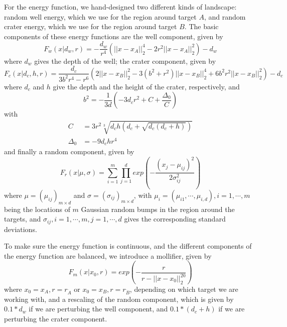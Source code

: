 \documentclass[nofootinbib,english, aip, jcp, priprint, graphicx,floatfix]{revtex4-1}
\theoremstyle{plain}
\theoremstyle{definition}
\theoremstyle{plain}
\begin{document}
For the energy function, we hand-designed two different kinds of landscape: random well energy, which we use for the region around target $A$, and random crater energy, which we use for the region around target $B$. The basic components of these energy functions are the well component, given by
\begin{equation}
F_w(x|d_w, r) = -\frac{d_w}{r^4}(||x - x_A||_2^4 - 2r^2||x - x_A||_2^2) - d_w
\end{equation}
where $d_w$ gives the depth of the well; the crater component, given by
\begin{equation}
F_c(x|d_c, h, r) = \frac{d_c}{3b^2r^4 - r^6}(2||x - x_B||_2^2 - 3(b^2 + r^2)||x - x_B||_2^4 + 6b^2r^2||x - x_B||_2^2) - d_c
\end{equation}
where $d_c$ and $h$ give the depth and the height of the crater, respectively, and
\begin{equation}
b^2 = -\frac{1}{3d}(-3 d_c r^2 + C + \frac{\Delta_0}{C})
\end{equation}
with
\begin{align*}
C &= 3r^2 \sqrt[3]{d_c h (d_c + \sqrt{d_c (d_c + h)})} \\
\Delta_0 &= -9 d_c h r^4
\end{align*}
and finally a random component, given by
\begin{equation}
F_r(x|\mu, \sigma) = \sum_{i=1}^m\prod_{j=1}^d exp(-\frac{(x_j - \mu_{i j})^2}{2\sigma_{i j}^2})
\end{equation}
where $\mu=(\mu_{i j})_{m \times d}$ and $\sigma=(\sigma_{i j})_{m \times d}$, with $\mu_i=(\mu_{i 1}, \cdots, \mu_{i, d}), i=1, \cdots, m$ being the locations of $m$ Gaussian random bumps in the region around the targets, and $\sigma_{i j}, i=1, \cdots, m, j=1, \cdots, d$ gives the corresponding standard deviations.

To make sure the energy function is continuous, and the different components of the energy function are balanced, we introduce a mollifier, given by
\begin{equation}
F_m(x|x_0, r) = exp(-\frac{r}{r - ||x - x_0||_2^{20}})
\end{equation}
where $x_0=x_A, r=r_{\dot A}$ or $x_0=x_B, r=r_{\dot B}$, depending on which target we are working with, and a rescaling of the random component, which is given by $0.1 * d_w$ if we are perturbing the well component, and $0.1 * (d_c + h)$ if we are perturbing the crater component.
\end{document}
